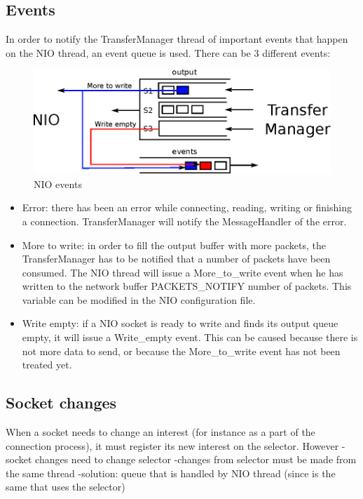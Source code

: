 \documentclass[11pt]{article}
\begin{document}
\subsection{Events}
	In order to notify the TransferManager thread of important events that happen on the NIO thread, an event queue is used. There can be 3 different events:
	\begin{figure}[H]
	\centering
	\includegraphics[width=120mm]{img/drawing7.eps}
	\caption[NIO events]{NIO events}
	\label{drawing7}
	\end{figure}
	\begin{itemize}
		\item Error: there has been an error while connecting, reading, writing or finishing a connection. TransferManager will notify the MessageHandler of the error.
		\item More to write: in order to fill the output buffer with more packets, the TransferManager has to be notified that a number of packets have been consumed. The NIO thread will issue a More\_to\_write event when he has written to the network buffer PACKETS\_NOTIFY number of packets. This variable can be modified in the NIO configuration file.
		\item Write empty: if a NIO socket is ready to write and finds its output queue empty, it will issue a Write\_empty event. This can be caused because there is not more data to send, or because the More\_to\_write event has not been treated yet.
	\end{itemize}
	
\subsection{Socket changes}
	When a socket needs to change an interest (for instance as a part of the connection process), it must register its new interest on the selector. However 
	-socket changes need to change selector
	-changes from selector must be made from the same thread
	-solution: queue that is handled by NIO thread (since is the same that uses the selector)
\end{document}
